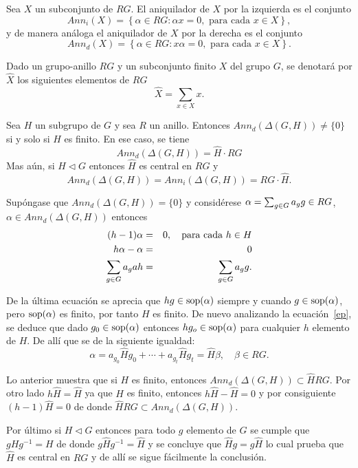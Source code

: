 \begin{definicion}
Sea $X$ un subconjunto de $RG$. El aniquilador de $X$ por la izquierda es el conjunto
\[ Ann_{i}(X) = \left\{ \alpha \in RG : \alpha x = 0, \mbox{ para cada } x \in X \right\},\]
y de manera análoga el aniquilador de $X$ por la derecha es el conjunto
\[ Ann_{d}(X) = \left\{ \alpha \in RG : x\alpha  = 0, \mbox{ para cada } x \in X \right\}.\]

\end{definicion}

\begin{definicion}
Dado un grupo-anillo $RG$ y un subconjunto finito $X$ del grupo $G$, se denotará por $\hat{X}$ los siguientes elementos de $RG$
\[\hat{X} = \sum_{x \in X}x.\] 
\end{definicion}

\begin{lema}
Sea $H$ un subgrupo de $G$ y sea $R$ un anillo. Entonces $Ann_{d}(\Delta(G,H)) \neq \{ 0\}$ si y solo si $H$ es finito. En ese caso, se tiene
$$Ann_d(\Delta(G,H)) = \hat{H} \cdot RG $$
Mas aún, si $H \lhd G$ entonces $\hat{H}$ es central en $RG$ y 
\[Ann_d(\Delta(G,H)) = Ann_i(\Delta(G,H)) = RG \cdot \hat{H}.\]
\end{lema}
\begin{proof*}
Supóngase que $Ann_d(\Delta(G,H)) = \{ 0\}$ y considérese $\alpha = \sum_{g \in G} a_{g} g \in RG$, $\alpha \in Ann_d(\Delta(G,H))$ entonces
\begin{eqnarray}
(h-1)\alpha &=& 0,  \quad \mbox{para cada } h \in H  \nonumber \\
h\alpha -\alpha &=&  0 \nonumber  \\
\sum_{g \in G} a_gah &=& \sum_{g \in G} a_{g} g. \label{ep}
\end{eqnarray}

De la última ecuación se aprecia que $hg \in \operatorname{sop}(\alpha)$ siempre y cuando $g \in \operatorname{sop}(\alpha)$, pero $\operatorname{sop}(\alpha)$ es finito, por tanto $H$ es finito.
De nuevo analizando la ecuación~\eqref{ep}, se deduce que dado $g_0 \in \operatorname{sop}(\alpha)$ entonces $hg_o \in \operatorname{sop}(\alpha)$ para cualquier $h$ elemento de $H$. De allí que se de la siguiente igualdad:
\[ \alpha = a_{g_0}\hat{H}g_0 + \cdots + a_{g_t}\hat{H}g_t = \hat{H}\beta, \quad \beta \in RG. \]

Lo anterior muestra que si $H$ es finito, entonces $Ann_d(\Delta(G,H))\subset \hat{H}RG$. Por otro lado $h\hat{H} = \hat{H}$ ya que $H$ es finito, entonces $h\hat{H} -\hat{H} = 0$ y por consiguiente $(h-1)\hat{H} = 0$ de donde $\hat{H}RG \subset Ann_d(\Delta(G,H))$.

Por último si $H \lhd G$ entonces para todo $g$ elemento de $G$ se cumple que $gHg^{-1} = H$ de donde $g\hat{H}g^{-1} = \hat{H}$ y se concluye que $\hat{H}g = g\hat{H}$ lo cual prueba que $\hat{H}$ es central en $RG$ y de allí se sigue fácilmente la conclusión. \qedhere
\end{proof*}

